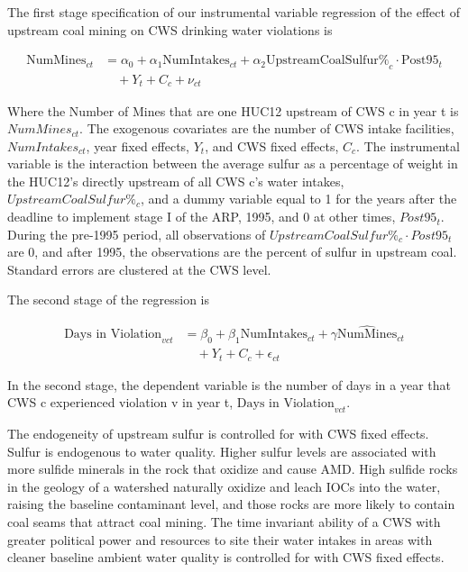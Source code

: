 \documentclass{article}
\begin{document}
The first stage specification of our instrumental variable regression of the effect of upstream coal mining on CWS drinking water violations is

\begin{equation}\label{1ststage2sls}
\begin{split}
\text{NumMines}_{ct} &= \alpha_0 + \alpha_1\text{NumIntakes}_{ct} + \alpha_2\text{UpstreamCoalSulfur\%}_c \cdot \text{Post95}_t \\
&\quad + Y_t + C_c + \nu_{ct}
\end{split}
\end{equation}

Where the Number of Mines that are one HUC12 upstream of CWS c in year t is $NumMines_{ct}$. The exogenous covariates are the number of CWS intake facilities, $NumIntakes_{ct}$, year fixed effects, $Y_t$, and CWS fixed effects, $C_c$. The instrumental variable is the interaction between the average sulfur as a percentage of weight in the HUC12's directly upstream of all CWS c's water intakes, $UpstreamCoalSulfur\%_c$, and a dummy variable equal to 1 for the years after the deadline to implement stage I of the ARP, 1995, and 0 at other times, $Post95_t$. During the pre-1995 period, all observations of $UpstreamCoalSulfur\%_c \cdot Post95_t$ are 0, and after 1995, the observations are the percent of sulfur in upstream coal. Standard errors are clustered at the CWS level. 

The second stage of the regression is

\begin{equation}\label{2ndstage2sls}
\begin{split}
\text{Days in Violation}_{vct} &= \beta_0 + \beta_1\text{NumIntakes}_{ct} + \gamma\widehat{\text{NumMines}}_{ct} \\
&\quad + Y_t + C_c + \epsilon_{ct}
\end{split}
\end{equation}

In the second stage, the dependent variable is the number of days in a year that CWS c experienced violation v in year t, $\text{Days in Violation}_{vct}$. 

The endogeneity of upstream sulfur is controlled for with CWS fixed effects. Sulfur is endogenous to water quality. Higher sulfur levels are associated with more sulfide minerals in the rock that oxidize and cause AMD. High sulfide rocks in the geology of a watershed naturally oxidize and leach IOCs into the water, raising the baseline contaminant level, and those rocks are more likely to contain coal seams that attract coal mining. The time invariant ability of a CWS with greater political power and resources to site their water intakes in areas with cleaner baseline ambient water quality is controlled for with CWS fixed effects.
\end{document}

